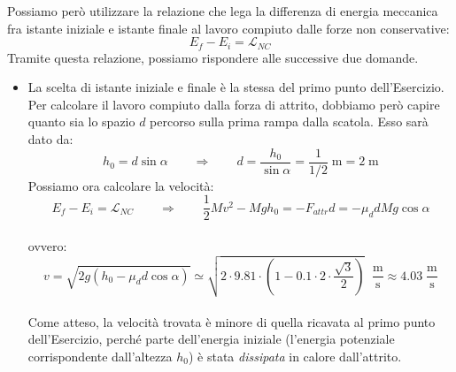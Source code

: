 \documentclass[12pt,a4paper]{book}
\begin{document}
Possiamo però utilizzare la relazione che lega la differenza di energia meccanica fra istante iniziale e istante finale al lavoro compiuto dalle forze non conservative: 
\begin{equation*}
E_{f} - E_{i} = \mathcal{L}
_{NC}
\end{equation*} 
Tramite questa relazione, possiamo rispondere alle successive due domande.
\begin{itemize}
\item La scelta di istante iniziale e finale è la stessa del primo punto dell'Esercizio. Per calcolare il lavoro compiuto dalla forza di attrito, dobbiamo però capire quanto sia lo spazio $d$ percorso sulla prima rampa dalla scatola. Esso sarà dato da:\\
\begin{equation*}
h_0 = d \sin \alpha \qquad  \Rightarrow \qquad d= \frac{h_0}{\sin\alpha} = \frac{1}{1/2} \; \text{m} = 2 \; \text{m}
\end{equation*}
Possiamo ora calcolare la velocità:
\begin{equation*}
E_{f} - E_{i} = \mathcal{L}
_{NC} \qquad  \Rightarrow \qquad \frac{1}{2}M  v^2 - Mg h_0 = -F_{attr} d = - \mu_d d M g \cos\alpha  
\end{equation*}\\
ovvero:
\begin{equation*}
v=\sqrt{2g(h_0-\mu_d  d \cos\alpha)}\simeq \sqrt{2\cdot 9.81 \cdot \left(1-0.1\cdot 2 \cdot \frac{\sqrt{3}}{2}\right)} \;\; \frac{\text{m}}{\text{s}} \approx 4.03 \; \frac{\text{m}}{\text{s}}
\end{equation*}\\
Come atteso, la velocità trovata è minore di quella ricavata al primo punto dell'Esercizio, perché parte dell'energia iniziale 
(l'energia potenziale corrispondente dall'altezza $h_0$) è stata \textit{dissipata} in calore dall'attrito. 


\end{itemize}
\end{document}
